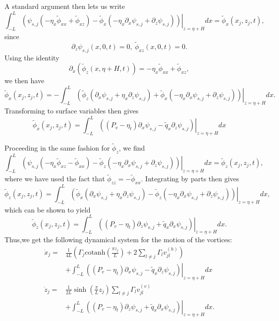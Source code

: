\documentclass[a4paper,11pt]{article}
\newcommand{\p}{\partial}
\begin{document}
A standard argument then lets us write 
\[
\int_{-L}^{L}\left.\left(\psi_{s,j}\left(- \eta_{x}\tilde{\phi}_{xx}+\tilde{\phi}_{xz}\right)-\tilde{\phi}_{x}\left(-\eta_{x}\p_{x}\psi_{s,j}+\p_{z}\psi_{s,j}\right) \right)\right|_{z= \eta+H} dx  = \tilde{\phi}_{x}(x_{j},z_{j},t),
\]
since
\[
\p_{z}\psi_{s,j}(x,0,t) = 0, ~ \tilde{\phi}_{xz}(x,0,t) = 0.
\]
Using the identity
\[
\p_{x}\left(\tilde{\phi}_{z}(x, \eta+H,t) \right) = -\eta_{x}\tilde{\phi}_{xx} + \tilde{\phi}_{xz},
\]
we then have 
\[
\tilde{\phi}_{x}(x_{j},z_{j},t) = -\int_{-L}^{L} \left.\left(\tilde{\phi}_{z}\left(\p_{x}\psi_{s,j}+ \eta_{x}\p_{z}\psi_{s,j}\right)+\tilde{\phi}_{x}\left(-\eta_{x}\p_{x}\psi_{s,j} + \p_{z}\psi_{s,j} \right) \right)\right|_{z=\eta+H}dx.
\]
Transforming to surface variables then gives
\[
\tilde{\phi}_{x}(x_{j},z_{j},t) = \int_{-L}^{L}\left.\left(\left(P_{v}-\eta_{t}\right)\p_{x}\psi_{s,j} - \tilde{q}_{x}\p_{z}\psi_{s,j} \right) \right|_{z=\eta+H} dx
\]

Proceeding in the same fashion for $\tilde{\phi}_{z}$, we find
\[
\int_{-L}^{L}\left.\left( \psi_{s,j}\left(-\eta_{x}\tilde{\phi}_{xz}-\tilde{\phi}_{xx}\right)-\tilde{\phi}_{z}\left(-\eta_{x}\p_{x}\psi_{s,j}+\p_{z}\psi_{s,j}\right) \right)\right|_{z=\eta+H} dx  = \tilde{\phi}_{z}(x_{j},z_{j},t),
\]
where we have used the fact that $\tilde{\phi}_{zz} = -\tilde{\phi}_{xx}$.  Integrating by parts then gives 
\[
\tilde{\phi}_{z}(x_{j},z_{j},t) = \int_{-L}^{L}\left.\left(\tilde{\phi}_{x}\left(\p_{x} \psi_{s,j}+ \eta_{x}\p_{z} \psi_{s,j}\right) -\tilde{\phi}_{z}\left(-\eta_{x}\p_{x} \psi_{s,j}+\p_{z}\psi_{s,j}\right)\right)\right|_{z=\eta+H}dx,
\]
which can be shown to yield
\[
\tilde{\phi}_{z}(x_{j},z_{j},t) = \int_{-L}^{L}\left.\left( \left(P_{v}-\eta_{t}\right)\p_{z}\psi_{s,j} + \tilde{q}_{x}\p_{x}\psi_{s,j} \right)\right|_{z=\eta+H} dx.
\]
Thus,we get the following dynamical system for the motion of the vortices:
\begin{align*}
\dot{x}_{j} = & \frac{1}{4L}\left(  \Gamma_{j}\mbox{cotanh}\left(\frac{\pi z_{j}}{L} \right)+2\sum_{l\neq j}\Gamma_{l}v_{jl}^{(h)} \right)\\
&  +\int_{-L}^{L}\left.\left(\left(P_{v} -\eta_{t}\right)\p_{x}\psi_{s,j} - \tilde{q}_{x}\p_{z}\psi_{s,j} \right)\right|_{z=\eta + H} dx\\
\dot{z}_{j} = &  \frac{1}{2L}\sinh\left(\frac{\pi}{L}z_{j}\right)\sum_{l\neq j} \Gamma_{l} v_{jl}^{(v)}\\
&  + \int_{-L}^{L}\left.\left( \left(P_{v} -\eta_{t}\right)\p_{z}\psi_{s,j} + \tilde{q}_{x}\p_{x}\psi_{s,j} \right)\right|_{z=\eta + H} dx.
\end{align*}
\end{document}
